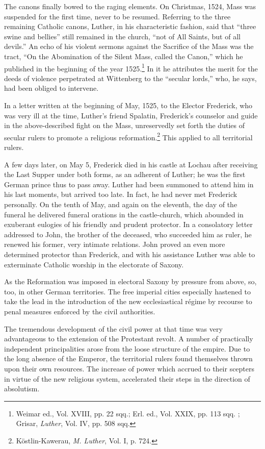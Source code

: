 The canons finally bowed to the raging elements. On Christmas,
1524, Mass was suspended for the first time, never to be resumed.
Referring to the three remaining Catholic canons, Luther, in his
characteristic fashion, said that “three swine and bellies” still remained
in the church, “not of All Saints, but of all devils.”
An echo of his violent sermons against the Sacrifice of the Mass
was the tract, “On the Abomination of the Silent Mass, called the
Canon,” which he published in the beginning of the year 1525.\footnote
{Weimar ed., Vol. XVIII, pp. 22 sqq.; Erl. ed., Vol. XXIX, pp. 113 sqq. ; Grisar,
\textit{Luther}, Vol. IV, pp. 508 sqq.}
In it he attributes the merit for the deeds of violence perpetrated at
Wittenberg to the “secular lords,” who, he says, had been obliged
to intervene.

In a letter written at the beginning of May, 1525, to the Elector
Frederick, who was very ill at the time, Luther’s friend Spalatin,
Frederick’s counselor and guide in the above-described fight on
the Mass, unreservedly set forth the duties of secular rulers to
promote a religious reformation.\footnote{Köstlin-Kawerau, \textit{M. Luther}, Vol. I, p. 724.}
This applied to all territorial rulers.

A few days later, on May 5, Frederick died in his castle at Lochau
after receiving the Last Supper under both forms, as an adherent of
Luther; he was the first German prince thus to pass away. Luther
had been summoned to attend him in his last moments, but arrived
too late. In fact, he had never met Frederick personally. On the
tenth of May, and again on the eleventh, the day of the funeral
he delivered funeral orations in the castle-church, which abounded
in exuberant eulogies of his friendly and prudent protector. In a
consolatory letter addressed to John, the brother of the deceased, who
succeeded him as ruler, he renewed his former, very intimate relations.
John proved an even more determined protector than Frederick,
and with his assistance Luther was able to exterminate Catholic worship
in the electorate of Saxony.

As the Reformation was imposed in electoral Saxony by pressure
from above, so, too, in other German territories. The free imperial
cities especially hastened to take the lead in the introduction of the
new ecclesiastical régime by recourse to penal measures enforced
by the civil authorities.

The tremendous development of the civil power at that time was
very advantageous to the extension of the Protestant revolt. A
number of practically independent principalities arose from the loose
structure of the empire. Due to the long absence of the Emperor,
the territorial rulers found themselves thrown upon their own resources.
The increase of power which accrued to their scepters in
virtue of the new religious system, accelerated their steps in the
direction of absolutism.

